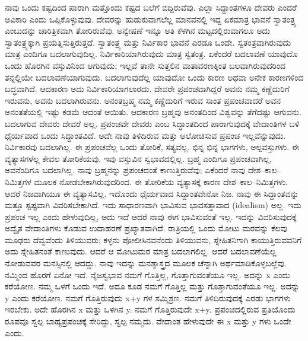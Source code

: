 ನಾವು ಒಂದು ಕಷ್ಟದಿಂದ ಪಾರಾಗಿ ಮತ್ತೊಂದು ಕಷ್ಟದ ಬಲೆಗೆ ಬಿದ್ದಿರುವೆವು. ಎಲ್ಲಾ ಸಿದ್ದಾಂತಗಳೂ ದೇವರು ಎಂದರೆ ಅವಿಕಾರಿ ಎಂದು ಒಪ್ಪಿಕೊಳ್ಳುವುವು. ದೇವರನ್ನು ಹುಡುಕುವಾಗಲೆಲ್ಲ ಮಾನವನಲ್ಲಿ ಇದ್ದ ಏಕಮಾತ್ರ ಭಾವನೆ ಸ್ವಾತಂತ್ರ್ಯ ಎಂಬುದನ್ನು ಚಾರಿತ್ರಿಕವಾಗಿ ತೋರಿರುವೆವು. ಅನ್ವೇಷಣೆ ಇನ್ನೂ ಅತಿ ಕೆಳಗಿನ ಮಟ್ಟದಲ್ಲಿರುವಾಗಲೂ ಅದು ಸ್ವಾತಂತ್ರ್ಯಕ್ಕಾಗಿ ಪ್ರಯತ್ನಿಸುತ್ತಿರುತ್ತದೆ. ಸ್ವಾತಂತ್ರ್ಯ ಮತ್ತು ನಿರ್ವಿಕಾರ ಭಾವನೆ ಎರಡೂ ಒಂದೇ. ಸ್ವತಂತ್ರವಾಗಿರುವುದು ಮಾತ್ರ ಎಂದಿಗೂ ಬದಲಾಗುವುದಿಲ್ಲ. ನಿರ್ವಿಕಾರಿಯಾಗಿರುವುದು ಮಾತ್ರ ಸ್ವತಂತ್ರ. ಏಕೆಂದರೆ ಬದಲಾವಣೆ ಯಾವುದೊ ಒಂದು ಹೊರಗಿನ ವಸ್ತುವಿನಿಂದ ಆಗುವುದು; ಇಲ್ಲವೆ ತಾನೇ ಸುತ್ತಲಿನ ವಾತಾವರಣಕ್ಕಿಂತ ಬಲವಾಗಿರುವುದರಿಂದ ತನ್ನಲ್ಲಿಯೇ ಬದಲಾವಣೆಯಾಗುವುದು. ಬದಲಾಗುವುದೆಲ್ಲ ಯಾವುದೋ ಒಂದು ಕಾರಣ ಅಥವಾ ಅನೇಕ ಕಾರಣಗಳಿಂದ ಬದ್ಧವಾಗಿದೆ. ಆದಕಾರಣ ಅದು ನಿರ್ವಿಕಾರಿಯಾಗಲಾರದು. ದೇವರೇ ಪ್ರಪಂಚವಾಗಿದ್ದರೆ ಅವನು ನಮ್ಮ ಕಣ್ಣೆದುರಿಗೆ ಇರುವನು, ಅವನು ಬದಲಾಗಿರುವನು. ಅನಂತಬ್ರಹ್ಮ ನಮ್ಮ ಕಣ್ಣೆದುರಿಗೆ ಇರುವ ಸಾಂತ ಪ್ರಪಂಚವಾದರೆ ಅವನ ಅನಂತತೆಯಲ್ಲಿ ಇಷ್ಟು ಕಡಮೆ ಆದಂತೆ ಆಯಿತು. ಆದಕಾರಣ ಬ್ರಹ್ಮವು ಅನಂತದಿಂದ ವಿಶ್ವವನ್ನು ತೆಗೆದಷ್ಟು ಆಗುವನು. ಬದಲಾಗುವ ದೇವರು ದೇವರೆ ಅಲ್ಲ. ಪ್ರಪಂಚವೇ ದೇವರು ಎಂಬ ಸಿದ್ಧಾಂತದಿಂದ ಪಾರಾಗುವುದಕ್ಕೆ ವೇದಾಂತಿಗಳ ಬಳಿ ಧೈರ್ಯವಾದ ಒಂದು ಸಿದ್ದಾಂತವಿದೆ. ಅದೇ ನಾವು ತಿಳಿದಿರುವ ಮತ್ತು ಆಲೋಚಿಸುವ ಪ್ರಪಂಚ ಇಲ್ಲವೆನ್ನುವುದು. ನಿರ್ವಿಕಾರವು ಬದಲಾಗಿಲ್ಲ. ಈ ಪ್ರಪಂಚವೆಲ್ಲ ಒಂದು ತೋರಿಕೆ, ಸತ್ಯವಲ್ಲ. ಭಿನ್ನ ಭಿನ್ನ ಭಾಗಗಳು, ಅಲ್ಪವಸ್ತುಗಳು. ಈ ವ್ಯತ್ಯಾಸಗಳೆಲ್ಲ ಕೇವಲ ತೋರಿಕೆಯವು. ಇವು ವಸ್ತುವಿನ ಸ್ವಭಾವದಲ್ಲಿಲ್ಲ. ಬ್ರಹ್ಮ ಎಂದಿಗೂ ಪ್ರಪಂಚವಾಗಿಲ್ಲ, ಅವನೆಂದಿಗೂ ಬದಲಾಗಿಲ್ಲ. ನಾವು ಬ್ರಹ್ಮನನ್ನು ಪ್ರಪಂಚದಂತೆ ಕಾಣುತ್ತಿರುವೆವು; ಏಕೆಂದರೆ ನಾವು ದೇಶ–ಕಾಲ–ನಿಮಿತ್ತಗಳ ಮೂಲಕ ನೋಡಬೇಕಾಗಿರುವುದರಿಂದ. ಈ ತೋರಿಕೆಯ ವ್ಯತ್ಯಾಸಕ್ಕೆ ಕಾರಣ ದೇಶ–ಕಾಲ–\-ನಿಮಿತ್ತಗಳು. ಆದರೆ ನಿಜವಾಗಿಯೂ ಈ ವ್ಯತ್ಯಾಸವಿಲ್ಲ. ಇದೊಂದು ಧೈರ್ಯವಾದ ಸಿದ್ದಾಂತವೇನೋ ನಿಜ. ನಾವು ಈ ಸಿದ್ದಾಂತವನ್ನು ಮತ್ತೂ ಸ್ಪಷ್ಟವಾಗಿ ವಿವರಿಸಬೇಕಾಗಿದೆ. ಇದು ಸಾಧಾರಣವಾಗಿ ಭಾವಿಸುವ ಭಾವಸತ್ತಾವಾದ (idealism) ಅಲ್ಲ. ಇದು ಪ್ರಪಂಚ ಇಲ್ಲ ಎಂದು ಹೇಳುವುದಿಲ್ಲ, ಅದು ಇದೆ ಆದರೆ ನಾವು ಈಗ ಭಾವಿಸುವಂತೆ ಇಲ್ಲ. ಇದನ್ನು ವಿವರಿಸುವುದಕ್ಕೆ ಅದ್ವೈತ ವೇದಾಂತಿಗಳು ಕೊಡುವ ಉದಾಹರಣೆ ಪ್ರಖ್ಯಾತವಾಗಿದೆ. ರಾತ್ರಿಯಲ್ಲಿ ಒಂದು ಮೋಟು ಮರವನ್ನು ಕೆಲವು ಮೂಢರು ದೆವ್ವವೆಂದು ತಿಳಿಯುವರು; ಕಳ್ಳನು ಪೋಲೀಸಿನವನೆಂದು ತಿಳಿಯುವನು, ಸ್ನೇಹಿತನಿಗಾಗಿ ಕಾಯುತ್ತಿರುವವನಿಗೆ ಅದು ಸ್ನೇಹಿತನಂತೆ ಕಾಣುವುದು. ಆದರೆ ಆ ಮೋಟುಮರ ಮಾತ್ರ ಬದಲಾಗಲಿಲ್ಲ. ಆದರೆ ಬದಲಾವಣೆಯೆಲ್ಲ ನೋಡುವವರ ಮನಸ್ಸಿನಲ್ಲಿ ಆದದ್ದು. ನಾವು ಇದನ್ನು ಮನಶ್ಶಾಸ್ತ್ರದ ಮೂಲಕ ಚೆನ್ನಾಗಿ ಅರ್ಥಮಾಡಿಕೊಳ್ಳಬಲ್ಲೆವು. ನಮ್ಮಿಂದ ಹೊರಗೆ ಏನೋ ಇದೆ. ನೈಜಸ್ವಭಾವ ನಮಗೆ ಗೊತ್ತಿಲ್ಲ, ಗೊತ್ತಾಗುವಂತೆಯೂ ಇಲ್ಲ. ಅದನ್ನು x ಎಂದು ಕರೆಯೋಣ. ನಮ್ಮ ಒಳಗೆ ಒಂದು ಇದೆ. ಅದೂ ಕೂಡ ನಮಗೆ ಗೊತ್ತಿಲ್ಲ ಮತ್ತು ಗೊತ್ತಾಗುವಂತೆಯೂ ಇಲ್ಲ. ಅದನ್ನು y ಎಂದು ಕರೆಯೋಣ. ನಮಗೆ ಗೊತ್ತಿರುವುದು x+y ಗಳ ಸಮ್ಮಿಶ್ರಣ. ನಮಗೆ ತಿಳಿದಿರುವುದಕ್ಕೆ ಎರಡು ಭಾಗಗಳು ಇರಬೇಕು. ಅದೇ ಹೊರಗಿನ x ಮತ್ತು ಒಳಗಿನ y. ನಮಗೆ ಗೊತ್ತಿರುವುದೇ x+y. ಪ್ರಪಂಚದಲ್ಲಿರುವ ಪ್ರತಿಯೊಂದು ರೂಪವೂ ಸ್ವಲ್ಪ ಬಾಹ್ಯಪ್ರಪಂಚಕ್ಕೆ ಸೇರಿದ್ದು, ಸ್ವಲ್ಪ ನಮ್ಮದು. ವೇದಾಂತ ಹೇಳುವುದೇ ಈ x ಮತ್ತು y ಗಳು ಒಂದೇ ಎಂದು.

